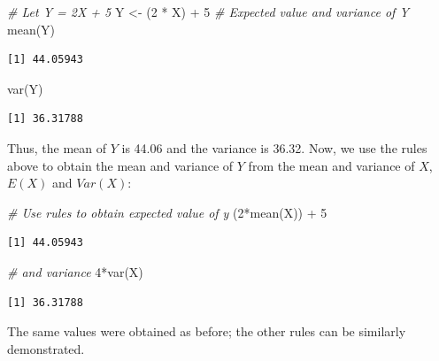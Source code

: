 \documentclass[
  oneside]{krantz}
\newenvironment{Shaded}{\begin{snugshade}}{\end{snugshade}}
\newcommand{\CommentTok}[1]{\textcolor[rgb]{0.56,0.35,0.01}{\textit{#1}}}
\newcommand{\DecValTok}[1]{\textcolor[rgb]{0.00,0.00,0.81}{#1}}
\newcommand{\FunctionTok}[1]{\textcolor[rgb]{0.00,0.00,0.00}{#1}}
\newcommand{\NormalTok}[1]{#1}
\newcommand{\OtherTok}[1]{\textcolor[rgb]{0.56,0.35,0.01}{#1}}
\newcommand{\SpecialCharTok}[1]{\textcolor[rgb]{0.00,0.00,0.00}{#1}}
\begin{document}
\begin{Shaded}
\begin{Highlighting}[]
\CommentTok{\# Let Y = 2X + 5}
\NormalTok{Y }\OtherTok{\textless{}{-}}\NormalTok{ (}\DecValTok{2} \SpecialCharTok{*}\NormalTok{ X) }\SpecialCharTok{+} \DecValTok{5}
\CommentTok{\# Expected value and variance of Y}
\FunctionTok{mean}\NormalTok{(Y)}
\end{Highlighting}
\end{Shaded}

\begin{verbatim}
[1] 44.05943
\end{verbatim}

\begin{Shaded}
\begin{Highlighting}[]
\FunctionTok{var}\NormalTok{(Y)}
\end{Highlighting}
\end{Shaded}

\begin{verbatim}
[1] 36.31788
\end{verbatim}

Thus, the mean of \(Y\) is 44.06 and the variance is 36.32. Now, we use the rules above to obtain the mean and variance of \(Y\) from the mean and variance of \(X\), \(E(X)\) and \(Var(X)\):

\begin{Shaded}
\begin{Highlighting}[]
\CommentTok{\# Use rules to obtain expected value of y}
\NormalTok{(}\DecValTok{2}\SpecialCharTok{*}\FunctionTok{mean}\NormalTok{(X)) }\SpecialCharTok{+} \DecValTok{5}
\end{Highlighting}
\end{Shaded}

\begin{verbatim}
[1] 44.05943
\end{verbatim}

\begin{Shaded}
\begin{Highlighting}[]
\CommentTok{\# and variance}
\DecValTok{4}\SpecialCharTok{*}\FunctionTok{var}\NormalTok{(X)}
\end{Highlighting}
\end{Shaded}

\begin{verbatim}
[1] 36.31788
\end{verbatim}

The same values were obtained as before; the other rules can be similarly demonstrated.
\end{document}
